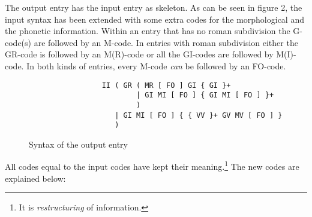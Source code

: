 The output entry has the input entry as skeleton. As can be seen in figure 2, 
the input syntax has been extended with some extra codes for the morphological 
and the phonetic information. Within an entry that has no roman subdivision 
the G-code(s) are followed by an M-code. In entries with roman subdivision 
either the GR-code is followed by an M(R)-code or all the GI-codes are followed 
by M(I)-code. In both kinds of entries, every M-code {\em can} be followed by 
an FO-code. 

\begin{figure}[ht]
 \begin{center}
  \begin{verbatim}
                 II ( GR ( MR [ FO ] GI { GI }+
                         | GI MI [ FO ] { GI MI [ FO ] }+
                         )
                    | GI MI [ FO ] { { VV }+ GV MV [ FO ] }
                    )
  \end{verbatim}
  \caption{Syntax of the output entry}
 \end{center}
\end{figure}

All codes equal to the input codes have kept their meaning.\footnote{It is
{\em restructuring} of information.} The new codes are explained below:

